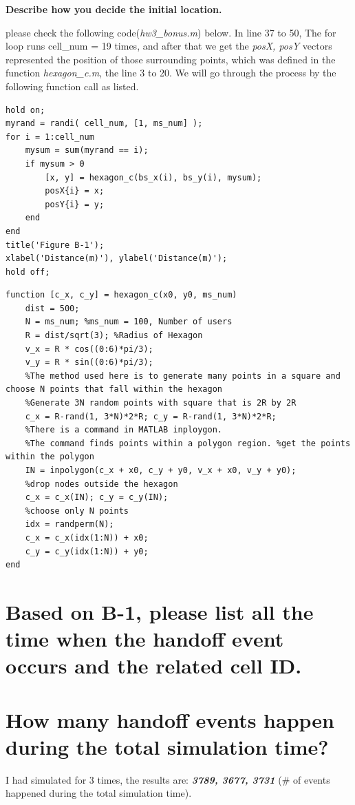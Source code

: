 \documentclass{article}
\begin{document}
\textbf{Describe how you decide the initial location.}

please check the following code(\emph{hw3\_bonus.m}) below. In line 37 to 50, The for loop runs cell\_num = 19 times, and after that we get the \emph{posX, posY} vectors represented the position of those surrounding points, which was defined in the function \emph{hexagon\_c.m}, the line 3 to 20. We will go through the process by the following function call as listed.
\pagebreak
\begin{lstlisting}[caption = {hw3\_bonus.m}]
%% B-2. Please plot a map with all mobile devices in their initial location.
hold on;
myrand = randi( cell_num, [1, ms_num] );
for i = 1:cell_num
    mysum = sum(myrand == i);
    if mysum > 0
        [x, y] = hexagon_c(bs_x(i), bs_y(i), mysum);
        posX{i} = x;
        posY{i} = y;
    end
end
title('Figure B-1');
xlabel('Distance(m)'), ylabel('Distance(m)');
hold off;
\end{lstlisting}

\begin{lstlisting}[caption = {hexagon\_c.m}]
function [c_x, c_y] = hexagon_c(x0, y0, ms_num)
    dist = 500;
    N = ms_num; %ms_num = 100, Number of users
    R = dist/sqrt(3); %Radius of Hexagon
    v_x = R * cos((0:6)*pi/3);
    v_y = R * sin((0:6)*pi/3);
    %The method used here is to generate many points in a square and choose N points that fall within the hexagon
    %Generate 3N random points with square that is 2R by 2R
    c_x = R-rand(1, 3*N)*2*R; c_y = R-rand(1, 3*N)*2*R;
    %There is a command in MATLAB inploygon.
    %The command finds points within a polygon region. %get the points within the polygon
    IN = inpolygon(c_x + x0, c_y + y0, v_x + x0, v_y + y0);
    %drop nodes outside the hexagon
    c_x = c_x(IN); c_y = c_y(IN);
    %choose only N points
    idx = randperm(N);
    c_x = c_x(idx(1:N)) + x0;
    c_y = c_y(idx(1:N)) + y0;
end
\end{lstlisting}
\section{Based on B-1, please list all the time when the handoff event occurs and the related cell ID.}


\section{How many handoff events happen during the total simulation time?}
I had simulated for 3 times, the results are: \textbf{\textit{3789, 3677, 3731}} (\# of events happened during the total simulation time).
\end{document}
